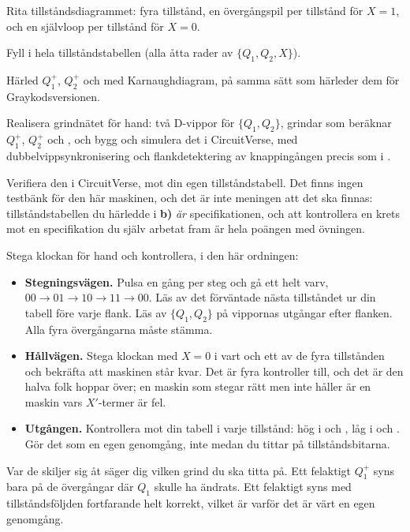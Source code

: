  Rita tillståndsdiagrammet: fyra tillstånd, en övergångspil per tillstånd för $X = 1$, och
en självloop per tillstånd för $X = 0$.

 Fyll i hela tillståndstabellen (alla åtta rader av $\{Q_1, Q_2, X\}$).

 Härled $Q_1^{+}$, $Q_2^{+}$ och  med Karnaughdiagram, på samma sätt som
 härleder dem för Graykodsversionen.

 Realisera grindnätet för hand: två D-vippor för $\{Q_1, Q_2\}$, grindar som beräknar
$Q_1^{+}$, $Q_2^{+}$ och , och bygg och simulera det i CircuitVerse, med
dubbelvippsynkronisering och flankdetektering av knappingången precis som i .

 Verifiera den i CircuitVerse, mot din egen tillståndstabell. Det finns ingen testbänk för
den här maskinen, och det är inte meningen att det ska finnas: tillståndstabellen du härledde i
\textbf{b)} \emph{är} specifikationen, och att kontrollera en krets mot en specifikation du själv
arbetat fram är hela poängen med övningen.

Stega klockan för hand och kontrollera, i den här ordningen:
\begin{itemize}
  \item \textbf{Stegningsvägen.} Pulsa  en gång per steg och gå ett helt varv,
    $00 \to 01 \to 10 \to 11 \to 00$. Läs av det förväntade nästa tillståndet ur din tabell före
    varje flank. Läs av $\{Q_1, Q_2\}$ på vippornas utgångar efter flanken. Alla fyra övergångarna
    måste stämma.
  \item \textbf{Hållvägen.} Stega klockan med $X = 0$ i vart och ett av de fyra tillstånden och
    bekräfta att maskinen står kvar. Det är fyra kontroller till, och det är den halva folk hoppar
    över; en maskin som stegar rätt men inte håller är en maskin vars $X'$-termer är fel.
  \item \textbf{Utgången.} Kontrollera  mot din tabell i varje tillstånd: hög i 
    och , låg i  och . Gör det som en egen genomgång, inte medan du
    tittar på tillståndsbitarna.
\end{itemize}

Var de skiljer sig åt säger dig vilken grind du ska titta på. Ett felaktigt $Q_1^{+}$ syns bara på
de övergångar där $Q_1$ skulle ha ändrats. Ett felaktigt  syns med tillståndsföljden
fortfarande helt korrekt, vilket är varför det är värt en egen genomgång.

